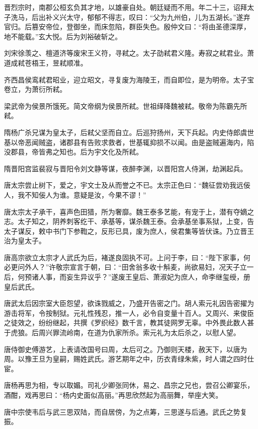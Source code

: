 \documentclass[a4paper,12pt,UTF8,twoside]{ctexbook}
\begin{document}
    晋烈宗时，南郡公桓玄负其才地，以雄豪自处。朝廷疑而不用。年二十三，诏拜太子洗马，后出补义兴太守，郁郁不得志，叹曰：“父为九州伯，儿为五湖长。”遂弃官归。后篡安帝位，登御坐，而床忽陷，群臣失色。殷仲文曰：“将由圣德深厚，地不能载。”玄大悦。后为刘裕破斩之。
    
    刘宋徐羡之、檀道济等废宋王义符，寻弒之。太子劭弒君义隆。寿寂之弒君业。萧道成弒苍梧王，昱弒顺准。
    
    齐西昌侯鸾弒君昭业，迎立昭文，寻复废为海陵王，而自即位，是为明帝。太子宝卷立，为萧衍所弒。
    
    梁武帝为侯景所饿死。简文帝纲为侯景所弒。世祖绎降魏被弒。敬帝为陈霸先所弒。
    
    隋杨广杀兄谋为皇太子，后弒父坚而自立。后巡狩扬州，天下兵起。内史侍郎虞世基以帝恶闻贼盗，诸郡县有告败求救者，世基辄抑损不以闻。由是盗贼遍海内，陷没郡县，帝皆弗之知也。后为宇文化及所弒。
    
    隋晋阳宫监裴寂与晋阳令刘文静等谋，夜醉李渊，以晋阳宫人侍渊，劫渊起兵。
    
    唐太宗尝止树下，爱之，宇文士及从而誉之不已。太宗正色曰：“魏征尝劝我远佞人，我不知佞人为谁。意疑是汝，今果不谬！”
    
    唐太宗太子承干，喜声色田猎，所为奢靡。魏王泰多艺能，有宠于上，潜有夺嫡之志。太子知之，阴养刺客纥干、承基等，谋杀魏王泰。会承基坐事系狱，上变，告太子谋反，敕中书门下参鞫之，反形已具，废为庶人，侯君集等皆伏诛。乃立晋王治为皇太子。
    
    唐高宗欲立太宗才人武氏为后，褚遂良固执不可。上问于李，曰：“陛下家事，何必更问外人？”许敬宗宣言于朝，曰：“田舍翁多收十斛麦，尚欲易妇，况天子立一后，何预诸人事，而妄生异议乎？”遂废王皇后、萧淑妃为庶人，命李继玺绶，册皇后武氏。
    
    唐武太后因宗室大臣怨望，欲诛戮威之，乃盛开告密之门。胡人索元礼因告密擢为游击将军，令按制狱。元礼性残忍，推一人，必令自变量十百人。又周兴、来俊臣之徒效之，纷纷继起，共撰《罗织经》数千言，教其徒网罗无辜。中外畏此数人甚于虎狼。后周兴罪流岭南，在道为仇家所杀。索元礼为太后杀之，以慰人望。
    
    唐侍御史傅游艺，上表请改国号曰周，太后可之。乃御则天楼，赦天下，以唐为周。以豫王旦为皇嗣，赐姓武氏。游艺期年之中，历衣青绿朱紫，时人谓之四时仕宦。
    
    唐杨再思为相，专以取媚。司礼少卿张同休，易之、昌宗之兄也，尝召公卿宴乐，酒酣，戏再思曰：“杨内史面似高丽。”再思欣然起为高丽舞，举座大笑。
    
    唐中宗使韦后与武三思双陆，而自居傍，为之点筹，三思遂与后通。武氏之势复振。
    
\end{document}

